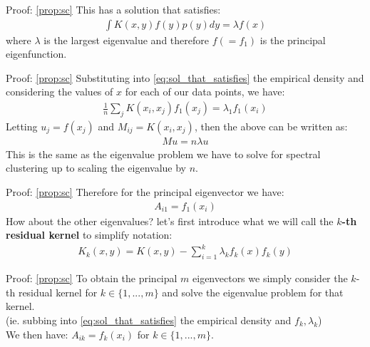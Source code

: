 \documentclass[aspectratio=169]{beamer}
\begin{document}
\begin{frame}{Proof: \cref{prop:sc}}
  This has a solution that satisfies:
  \begin{align} \label{eq:sol_that_satisfies}
    \int K(x,y) f(y) p(y) dy = \lambda f(x)
  \end{align}
  where $\lambda$ is the largest eigenvalue and therefore $f (=f_{1})$ is the principal eigenfunction.
\end{frame}

\begin{frame}{Proof: \cref{prop:sc}}
  Substituting into \cref{eq:sol_that_satisfies} the empirical density and considering the values of $x$ for each of our data points, we have:
  \begin{align*}
    \frac{1}{n} \sum_{j} K(x_{i},x_{j}) f_{1}(x_{j}) = \lambda_{1} f_{1}(x_{i})
  \end{align*}
  Letting $u_{j}=f(x_{j})$ and $M_{ij} = K(x_{i},x_{j})$, then the above can be written as:
  \begin{align*}
    M u = n \lambda u 
  \end{align*}
  This is the same as the eigenvalue problem we have to solve for spectral clustering up to scaling the eigenvalue by $n$. 
\end{frame}

\begin{frame}{Proof: \cref{prop:sc}}
  Therefore for the principal eigenvector we have:
  \begin{align*}
    A_{i1} = f_{1} (x_{i})
  \end{align*}
  How about the other eigenvalues? let's first introduce what we will call the \textbf{$k$-th residual kernel} to simplify notation:
  \begin{align}
    K_{k}(x,y) = K(x,y) - \sum_{i=1}^{k} \lambda_{k} f_{k} (x) f_{k} (y) 
  \end{align}

\end{frame}

\begin{frame}{Proof: \cref{prop:sc}}
  To obtain the principal $m$ eigenvectors we simply consider the $k$-th residual kernel for $k \in \{1,...,m\}$ and solve the eigenvalue problem for that kernel.
  \\ \hfill \break
  (ie. subbing into \cref{eq:sol_that_satisfies} the empirical density and $f_{k}, \lambda_{k}$)
  \\ \hfill \break
  We then have: $A_{ik} = f_{k} (x_{i})$ for $k \in \{1,...,m\}$.
\end{frame}
\end{document}
